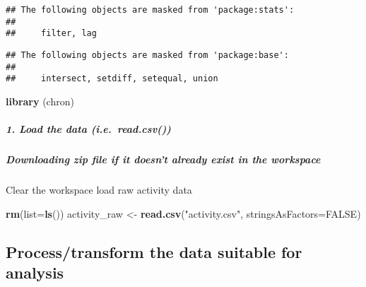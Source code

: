 \documentclass[]{article}
\newenvironment{Shaded}{\begin{snugshade}}{\end{snugshade}}
\newcommand{\KeywordTok}[1]{\textcolor[rgb]{0.13,0.29,0.53}{\textbf{#1}}}
\newcommand{\DataTypeTok}[1]{\textcolor[rgb]{0.13,0.29,0.53}{#1}}
\newcommand{\StringTok}[1]{\textcolor[rgb]{0.31,0.60,0.02}{#1}}
\newcommand{\OtherTok}[1]{\textcolor[rgb]{0.56,0.35,0.01}{#1}}
\newcommand{\NormalTok}[1]{#1}
\let\oldsubparagraph\subparagraph
\renewcommand{\subparagraph}[1]{\oldsubparagraph{#1}\mbox{}}
\begin{document}
\begin{verbatim}
## The following objects are masked from 'package:stats':
## 
##     filter, lag
\end{verbatim}

\begin{verbatim}
## The following objects are masked from 'package:base':
## 
##     intersect, setdiff, setequal, union
\end{verbatim}

\begin{Shaded}
\begin{Highlighting}[]
\KeywordTok{library}\NormalTok{ (chron)}
\end{Highlighting}
\end{Shaded}

\subparagraph{1. Load the data
(i.e.~read.csv())}\label{load-the-data-i.e.read.csv}

\subparagraph{Downloading zip file if it doesn't already exist in the
workspace}\label{downloading-zip-file-if-it-doesnt-already-exist-in-the-workspace}

\begin{Shaded}
\end{Shaded}

Clear the workspace load raw activity data

\begin{Shaded}
\begin{Highlighting}[]
\KeywordTok{rm}\NormalTok{(}\DataTypeTok{list=}\KeywordTok{ls}\NormalTok{())}
\NormalTok{activity_raw <-}\StringTok{ }\KeywordTok{read.csv}\NormalTok{(}\StringTok{"activity.csv"}\NormalTok{, }\DataTypeTok{stringsAsFactors=}\OtherTok{FALSE}\NormalTok{)}
\end{Highlighting}
\end{Shaded}

\subsection{Process/transform the data suitable for
analysis}\label{processtransform-the-data-suitable-for-analysis}
\end{document}
